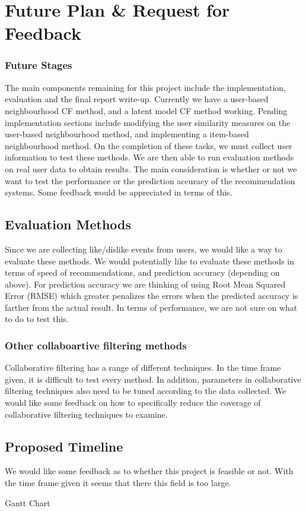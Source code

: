 \chapter{Future Plan \& Request for Feedback}\label{C:future}

\subsection{Future Stages}

The main components remaining for this project include the implementation, evaluation and the final report write-up. Currently we have a user-based neighbourhood CF method, and a latent model CF method working. Pending implementation sections include modifying the user similarity measures on the user-based neighbourhood method, and implementing a item-based neighbourhood method. On the completion of these tasks, we must collect user information to test these methods. We are then able to run evaluation methods on real user data to obtain results. The main consideration is whether or not we want to test the performance or the prediction accuracy of the recommendation systems. Some feedback would be appreciated in terms of this.

\section{Evaluation Methods}

Since we are collecting like/dislike events from users, we would like a way to evaluate these methods. We would potentially like to evaluate these methods in terms of speed of recommendations, and prediction accuracy (depending on above). For prediction accuracy we are thinking of using Root Mean Squared Error (RMSE) which greater penalizes the errors when the predicted accuracy is farther from the actual result. In terms of performance, we are not sure on what to do to test this. 

\subsection{Other collaboartive filtering methods}

Collaborative filtering has a range of different techniques. In the time frame given, it is difficult to test every method. In addition, parameters in collaborative filtering techniques also need to be tuned according to the data collected. We would like some feedback on how to specifically reduce the coverage of collaborative filtering techniques to examine. 

\section{Proposed Timeline}

We would like some feedback as to whether this project is feasible or not. With the time frame given it seems that there this field is too large. 


Gantt Chart


